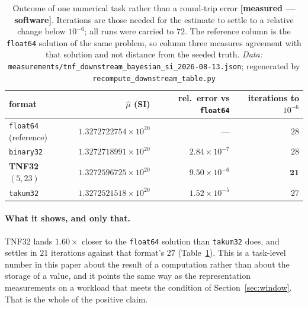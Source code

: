 \documentclass[11pt]{article}
\theoremstyle{definition}
\begin{document}
\begin{table}[t]\centering
\caption{Outcome of one numerical task rather than a round-trip error
\textbf{[measured --- software]}. Iterations are those needed for the estimate to
settle to a relative change below $10^{-6}$; all runs were carried to $72$.
The reference column is the \texttt{float64} solution of the same problem, so
column three measures agreement with that solution and not distance from the
seeded truth. \emph{Data:} \texttt{measurements/tnf\_downstream\_bayesian\_si\_2026-08-13.json}; regenerated by \texttt{recompute\_downstream\_table.py}}
\label{tab:downstream}
\begin{tabular}{lrrr}
\toprule
format & $\hat\mu$ (SI) & rel.\ error vs \texttt{float64} & iterations to $10^{-6}$ \\
\midrule
\texttt{float64} (reference) & $1.3272722754\times 10^{20}$ & --- & $28$ \\
\texttt{binary32}            & $1.3272718991\times 10^{20}$ & $2.84\times 10^{-7}$ & $28$ \\
\textbf{TNF32 $(5,23)$}      & $1.3272596725\times 10^{20}$ & $9.50\times 10^{-6}$ & $\mathbf{21}$ \\
\texttt{takum32}             & $1.3272521518\times 10^{20}$ & $1.52\times 10^{-5}$ & $27$ \\
\bottomrule
\end{tabular}
\end{table}

\paragraph{What it shows, and only that.} TNF32 lands $1.60\times$ closer to the
\texttt{float64} solution than \texttt{takum32} does, and settles in $21$
iterations against that format's $27$ (Table~\ref{tab:downstream}). This is a task-level number in this paper
about the result of a computation rather than about the storage of a value, and it
points the same way as the representation measurements on a workload that meets
the condition of Section~\ref{sec:window}. That is the whole of the positive
claim.
\end{document}
